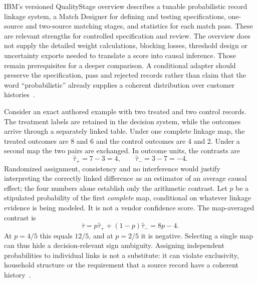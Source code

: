 IBM's versioned QualityStage overview describes a tunable probabilistic record
linkage system, a Match Designer for defining and testing specifications,
one-source and two-source matching stages, and statistics for each match pass.
These are relevant strengths for controlled specification and review. The
overview does not supply the detailed weight calculations, blocking losses,
threshold design or uncertainty exports needed to translate a score into causal
inference. Those remain prerequisites for a deeper comparison. A conditional
adapter should preserve the specification, pass and rejected records rather than
claim that the word ``probabilistic'' already supplies a coherent distribution
over customer histories~\citep{exec22_obs_ibm_matching}.

Consider an exact authored example with two treated and two control records. The
treatment labels are retained in the decision system, while the outcomes arrive
through a separately linked table. Under one complete linkage map, the treated
outcomes are 8 and 6 and the control outcomes are 4 and 2. Under a second map the
two pairs are exchanged. In outcome units, the contrasts are
\begin{equation}
 \widehat\tau_{+}=7-3=4,\qquad
 \widehat\tau_{-}=3-7=-4.
 \label{exec22:obs-maps}
\end{equation}
Randomized assignment, consistency and no interference would justify interpreting
the correctly linked difference as an estimator of an average causal effect;
the four numbers alone establish only the arithmetic contrast. Let $p$ be a
stipulated probability of the first \emph{complete} map, conditional on whatever
linkage evidence is being modeled. It is not a vendor confidence score. The
map-averaged contrast is
\begin{equation}
 \overline\tau=p\widehat\tau_{+}+(1-p)\widehat\tau_{-}=8p-4.
 \label{exec22:obs-mixture}
\end{equation}
At $p=4/5$ this equals $12/5$, and at $p=2/5$ it is negative. Selecting a single
map can thus hide a decision-relevant sign ambiguity. Assigning independent
probabilities to individual links is not a substitute: it can violate exclusivity,
household structure or the requirement that a source record have a coherent
history~\citep{exec22_obs_reference}.


